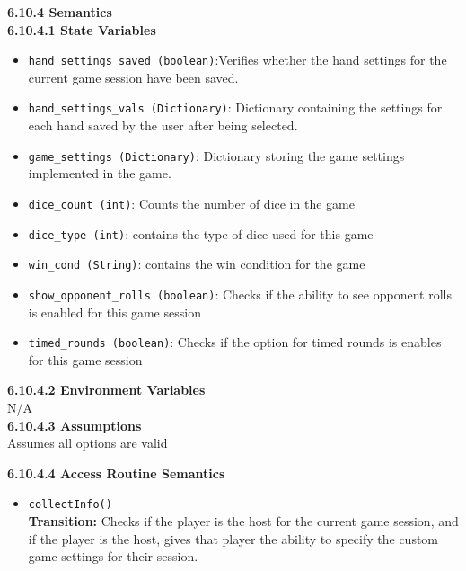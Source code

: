 \documentclass[12pt, titlepage]{article}
\begin{document}
\noindent \textbf{6.10.4 Semantics}\\
\textbf{6.10.4.1 State Variables}\\
\begin{itemize}
	\item \texttt{hand\_settings\_saved (boolean)}:Verifies whether the hand settings for the current game session have been saved.
	\item \texttt{hand\_settings\_vals (Dictionary)}: Dictionary containing the settings for each hand saved by the user after being selected.
	\item \texttt{game\_settings (Dictionary)}: Dictionary storing the game settings implemented in the game.
	\item \texttt{dice\_count (int)}: Counts the number of dice in the game
	\item \texttt{dice\_type (int)}: contains the type of dice used for this game
	\item \texttt{win\_cond (String)}: contains the win condition for the game
	\item \texttt{show\_opponent\_rolls (boolean)}: Checks if the ability to see opponent rolls is enabled for this game session
	\item \texttt{timed\_rounds (boolean)}: Checks if the option for timed rounds is enables for this game session

\end{itemize}

\textbf{6.10.4.2 Environment Variables}\\

N/A\\

\textbf{6.10.4.3 Assumptions}\\
Assumes all options are valid 

\textbf{6.10.4.4 Access Routine Semantics}
\begin{itemize}

	\item \texttt{collectInfo()}\\
	\textbf{Transition:} Checks if the player is the host for the current game session, and if the player is the host, gives that player the ability to specify the custom game settings for their session.

\end{itemize}
\end{document}
